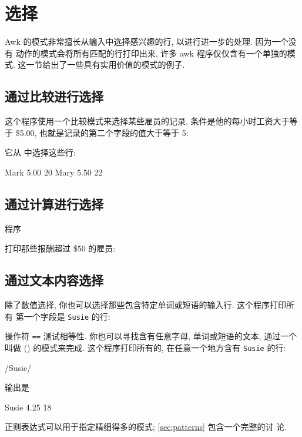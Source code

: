 \section{选择}
\label{sec:selection}

Awk 的模式非常擅长从输入中选择感兴趣的行, 以进行进一步的处理. 因为一个没有
动作的模式会将所有匹配的行打印出来, 许多 awk 程序仅仅含有一个单独的模式.
这一节给出了一些具有实用价值的模式的例子.

\subsection{通过比较进行选择}
\label{subsec:selection_by_comparison}

这个程序使用一个比较模式来选择某些雇员的记录, 条件是他的每小时工资大于等于
\$5.00, 也就是记录的第二个字段的值大于等于 5:
它从  中选择这些行:
\begin{awkcode}
    Mark    5.00    20
    Mary    5.50    22
\end{awkcode}

\subsection{通过计算进行选择}
\label{subsec:selection_by_computation}

程序
打印那些报酬超过 \$50 的雇员:

\subsection{通过文本内容选择}
\label{subsec:selection_by_text_content}

除了数值选择, 你也可以选择那些包含特定单词或短语的输入行. 这个程序打印所有
第一个字段是 \texttt{Susie} 的行:
操作符 \texttt{==} 测试相等性. 你也可以寻找含有任意字母, 单词或短语的文本,
通过一个叫做 () 的模式来完成.
这个程序打印所有的, 在任意一个地方含有 \texttt{Susie} 的行:
\begin{awkcode}
    /Susie/
\end{awkcode}
输出是
\begin{file}
    Susie   4.25    18
\end{file}
正则表达式可以用于指定精细得多的模式; \ref{sec:patterns} 包含一个完整的讨
论.

